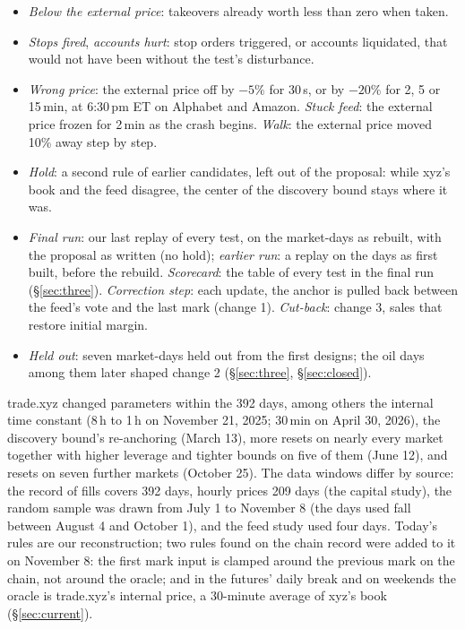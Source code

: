 \documentclass[10.5pt,a4paper]{article}
\begin{document}
\begin{itemize}[leftmargin=1.2em,itemsep=0pt,topsep=.2ex]
\item \emph{Below the external price}: takeovers already worth less than zero when taken.
\item \emph{Stops fired}, \emph{accounts hurt}: stop orders triggered, or accounts liquidated, that would not have been without the test's disturbance.
\item \emph{Wrong price}: the external price off by $-5\%$ for 30\,s, or by $-20\%$ for 2, 5 or 15\,min, at 6:30\,pm ET on Alphabet and Amazon. \emph{Stuck feed}: the external price frozen for 2\,min as the crash begins. \emph{Walk}: the external price moved 10\% away step by step.
\item \emph{Hold}: a second rule of earlier candidates, left out of the proposal: while xyz's book and the feed disagree, the center of the discovery bound stays where it was.
\item \emph{Final run}: our last replay of every test, on the market-days as rebuilt, with the proposal as written (no hold); \emph{earlier run}: a replay on the days as first built, before the rebuild. \emph{Scorecard}: the table of every test in the final run (\S\ref{sec:three}). \emph{Correction step}: each update, the anchor is pulled back between the feed's vote and the last mark (change 1). \emph{Cut-back}: change 3, sales that restore initial margin.
\item \emph{Held out}: seven market-days held out from the first designs; the oil days among them later shaped change 2 (\S\ref{sec:three}, \S\ref{sec:closed}).
\end{itemize}
trade.xyz changed parameters within the 392 days, among others the internal time constant (8\,h to 1\,h on November 21, 2025; 30\,min on April 30, 2026), the discovery bound's re-anchoring (March 13), more resets on nearly every market together with higher leverage and tighter bounds on five of them (June 12), and resets on seven further markets (October 25). The data windows differ by source: the record of fills covers 392 days, hourly prices 209 days (the capital study), the random sample was drawn from July 1 to November 8 (the days used fall between August 4 and October 1), and the feed study used four days. Today's rules are our reconstruction; two rules found on the chain record were added to it on November 8: the first mark input is clamped around the previous mark on the chain, not around the oracle; and in the futures' daily break and on weekends the oracle is trade.xyz's internal price, a 30-minute average of xyz's book (\S\ref{sec:current}).
\end{document}
